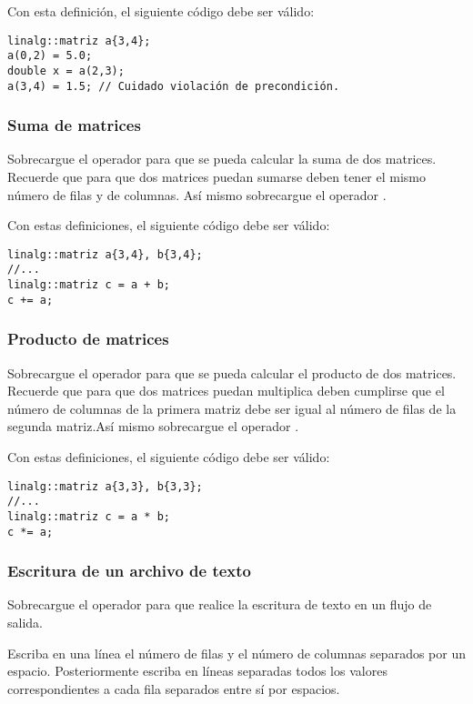 Con esta definición, el siguiente código debe ser válido:

\begin{lstlisting}
linalg::matriz a{3,4};
a(0,2) = 5.0;
double x = a(2,3);
a(3,4) = 1.5; // Cuidado violación de precondición.
\end{lstlisting}

\subsubsection{Suma de matrices}

Sobrecargue el operador \cppkey{+} para que se pueda calcular la suma de dos
matrices. Recuerde que para que dos matrices puedan sumarse deben tener el mismo
número de filas y de columnas. Así mismo sobrecargue el operador \cppkey{+=}.

Con estas definiciones, el siguiente código debe ser válido:

\begin{lstlisting}
linalg::matriz a{3,4}, b{3,4};
//...
linalg::matriz c = a + b;
c += a;
\end{lstlisting}

\subsubsection{Producto de matrices}

Sobrecargue el operador \cppkey{*} para que se pueda calcular el producto de dos
matrices. Recuerde que para que dos matrices puedan multiplica deben 
cumplirse que el número de columnas de la primera matriz debe ser igual al
número de filas de la segunda matriz.Así mismo sobrecargue el operador \cppkey{*=}.

Con estas definiciones, el siguiente código debe ser válido:

\begin{lstlisting}
linalg::matriz a{3,3}, b{3,3};
//...
linalg::matriz c = a * b;
c *= a;
\end{lstlisting}

\subsubsection{Escritura de un archivo de texto}

Sobrecargue el operador \cppkey{<<} para que realice la escritura de texto en un
flujo de salida.

Escriba en una línea el número de filas y el número de columnas separados por un
espacio. Posteriormente escriba en líneas separadas todos los valores
correspondientes a cada fila separados entre sí por espacios.

